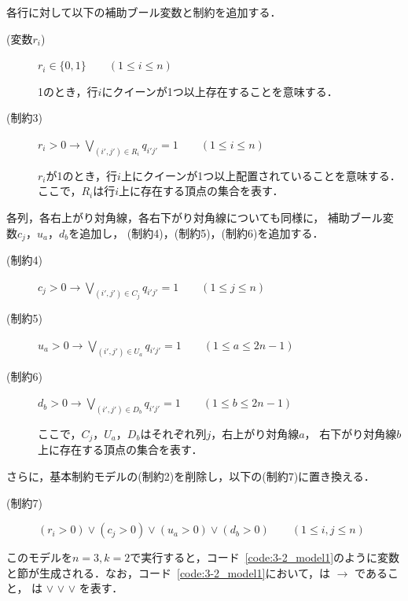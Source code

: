 各行に対して以下の補助ブール変数と制約を追加する．
\begin{description}
 \item[(変数$r_i$)] $r_{i} \in \{0,1\} \qquad (1 \leq i \leq n)$\par
  1のとき，行$i$にクイーンが1つ以上存在することを意味する．
 \item[(制約3)] $r_{i}>0 \rightarrow \bigvee\limits_{(i',j')\in R_{i}} q_{i'j'}=1 \qquad (1 \leq i \leq n)$ \par
  $r_{i}$が1のとき，行$i$上にクイーンが1つ以上配置されていることを意味する．
  ここで，$R_i$は行$i$上に存在する頂点の集合を表す．
\end{description}
%
各列，各右上がり対角線，各右下がり対角線についても同様に，
補助ブール変数$c_{j}$，$u_{a}$，$d_{b}$を追加し，
(制約4)，(制約5)，(制約6)を追加する．
%
\begin{description}
 \item[(制約4)] $c_{j}>0 \rightarrow \bigvee\limits_{(i',j')\in C_{j}} q_{i'j'}=1 \qquad (1 \leq j \leq n)$ 
 \item[(制約5)] $u_{a}>0 \rightarrow \bigvee\limits_{(i',j')\in U_{a}} q_{i'j'}=1 \qquad (1 \leq a \leq 2n-1)$ 
 \item[(制約6)] $d_{b}>0 \rightarrow \bigvee\limits_{(i',j')\in D_{b}} q_{i'j'}=1 \qquad (1 \leq b \leq 2n-1)$ \par
  ここで，$C_j$，$U_{a}$，$D_{b}$はそれぞれ列$j$，右上がり対角線$a$，
  右下がり対角線$b$上に存在する頂点の集合を表す．
\end{description}

さらに，基本制約モデルの(制約2)を削除し，以下の(制約7)に置き換える．
\begin{description}
 \item[(制約7)] $(r_i > 0) \vee (c_j >0) \vee (u_{a}>0) \vee (d_{b}>0) \qquad (1 \leq i,j \leq n)$
\end{description}

このモデルを$n=3,k=2$で実行すると，コード~\ref{code:3-2_model1}のように変数と節が生成される．なお，コード~\ref{code:3-2_model1}において，は $\rightarrow$ であること，   は $\vee$  $\vee$  $\vee$ を表す．



